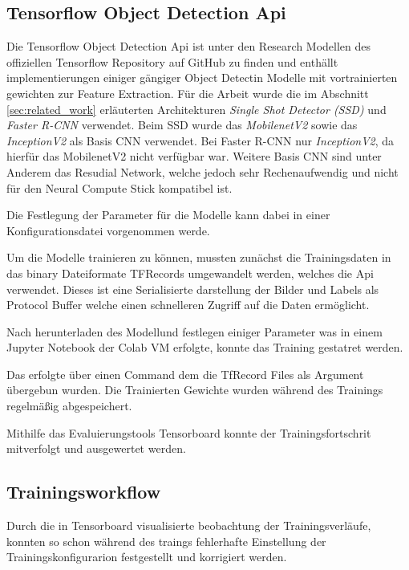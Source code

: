 \subsection{Tensorflow Object Detection Api}



Die Tensorflow Object Detection Api ist unter den Research Modellen
\cite{tfobjdet} des offiziellen Tensorflow Repository auf GitHub zu
finden und enthällt implementierungen einiger gängiger Object Detectin
Modelle mit vortrainierten gewichten zur Feature Extraction.
Für die Arbeit wurde die im Abschnitt \ref{sec:related_work} 
erläuterten Architekturen \textit{Single Shot Detector (SSD)}
und \textit{Faster R-CNN} verwendet.
Beim SSD wurde das \textit{MobilenetV2} sowie das \textit{InceptionV2} 
als Basis CNN verwendet.
Bei Faster R-CNN nur \textit{InceptionV2}, da hierfür das MobilenetV2 
nicht verfügbar war.
Weitere Basis CNN sind unter Anderem das Resudial Network, welche jedoch 
sehr Rechenaufwendig und nicht für den Neural Compute Stick 
kompatibel ist.

Die Festlegung der Parameter für die Modelle kann dabei 
in einer Konfigurationsdatei vorgenommen werde.


Um die Modelle trainieren zu können, mussten zunächst die 
Trainingsdaten in das binary Dateiformate TFRecords umgewandelt 
werden, welches die Api verwendet. Dieses ist eine Serialisierte 
darstellung der Bilder und Labels als Protocol Buffer welche einen 
schnelleren Zugriff auf die Daten ermöglicht.

Nach herunterladen des Modellund festlegen einiger Parameter was in 
einem Jupyter Notebook der Colab VM erfolgte, konnte das Training 
gestatret werden. 

Das erfolgte über einen Command dem die TfRecord Files als Argument 
übergebun wurden. 
Die Trainierten Gewichte wurden während des Trainings regelmäßig abgespeichert.

Mithilfe das Evaluierungstools Tensorboard konnte der Trainingsfortschrit 
mitverfolgt und ausgewertet werden.


\subsection{Trainingsworkflow}

Durch die in Tensorboard visualisierte beobachtung der 
Trainingsverläufe, konnten so schon während des traings fehlerhafte 
Einstellung der Trainingskonfigurarion festgestellt und korrigiert 
werden.

